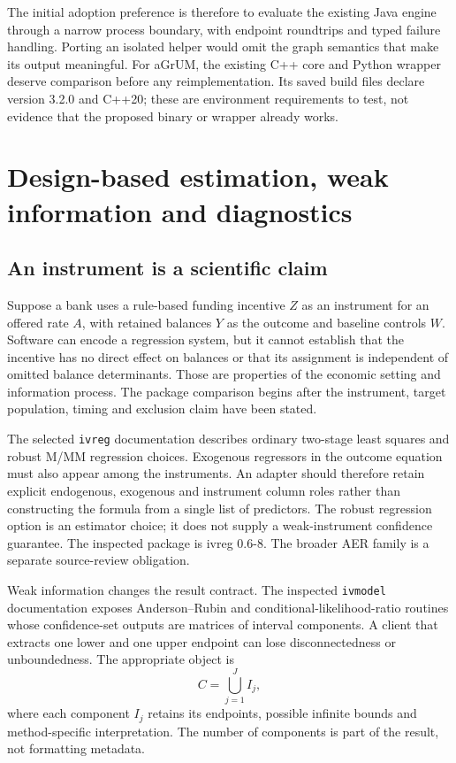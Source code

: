 The initial adoption preference is therefore to evaluate the existing Java
engine through a narrow process boundary, with endpoint roundtrips and typed
failure handling. Porting an isolated helper would omit the graph semantics
that make its output meaningful. For aGrUM, the existing C++ core and Python
wrapper deserve comparison before any reimplementation. Its saved build files
declare version 3.2.0 and C++20; these are environment requirements to test,
not evidence that the proposed binary or wrapper already works.

\chapter{Design-based estimation, weak information and diagnostics}
\label{sw:design}

\section{An instrument is a scientific claim}

Suppose a bank uses a rule-based funding incentive \(Z\) as an instrument for
an offered rate \(A\), with retained balances \(Y\) as the outcome and baseline
controls \(W\). Software can encode a regression system, but it cannot establish
that the incentive has no direct effect on balances or that its assignment is
independent of omitted balance determinants. Those are properties of the
economic setting and information process. The package comparison begins after
the instrument, target population, timing and exclusion claim have been stated.

The selected \texttt{ivreg} documentation describes ordinary two-stage least
squares and robust M/MM regression choices. Exogenous regressors in the outcome
equation must also appear among the instruments. An adapter should therefore
retain explicit endogenous, exogenous and instrument column roles rather than
constructing the formula from a single list of predictors. The robust regression
option is an estimator choice; it does not supply a weak-instrument confidence
guarantee. The inspected package is ivreg 0.6-8. The broader AER family is a
separate source-review obligation.\cite{v12_sw_ivreg}

Weak information changes the result contract. The inspected \texttt{ivmodel}
documentation exposes Anderson--Rubin and conditional-likelihood-ratio routines
whose confidence-set outputs are matrices of interval components. A client
that extracts one lower and one upper endpoint can lose disconnectedness or
unboundedness. The appropriate object is
\[
 C=\bigcup_{j=1}^{J} I_j,
\]
where each component \(I_j\) retains its endpoints, possible infinite bounds and
method-specific interpretation. The number of components is part of the result,
not formatting metadata.\cite{v12_sw_ivmodel}

